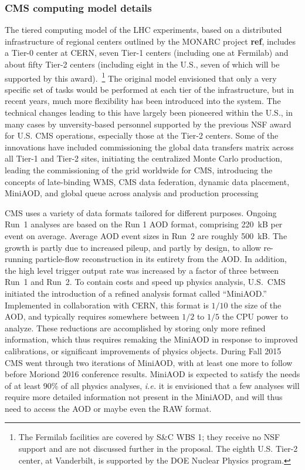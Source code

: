 \documentclass[11pt,a4paper]{article}
\begin{document}
\subsubsection{CMS computing model details}
\label{computingmodeldetails}
The tiered computing model of the LHC experiments, based on a distributed
infrastructure of regional centers outlined by the MONARC project {\bf
  ref}, includes a Tier-0 center at CERN, seven Tier-1 centers (including
one at Fermilab) and about fifty Tier-2 centers (including eight in the
U.S., seven of which will be supported by this award).~\footnote{The
  Fermilab facilities are covered by S\&C WBS 1; they receive no NSF
  support and are not discussed further in the proposal.  The eighth
  U.S. Tier-2 center, at Vanderbilt, is supported by the DOE Nuclear
  Physics program.}  The original model envisioned that only a very
specific set of tasks would be performed at each tier of the
infrastructure, but in recent years, much more flexibility has been
introduced into the system.  The technical changes leading to this have
largely been pioneered within the U.S., in many cases by unversity-based
personnel supported by the previous NSF award for U.S. CMS operations,
especially those at the Tier-2 centers.  Some of the innovations have
included commissioning the global data transfers matrix across all Tier-1
and Tier-2 sites, initiating the centralized Monte Carlo production,
leading the commissioning of the grid worldwide for CMS, introducing the
concepts of late-binding WMS, CMS data federation, dynamic data placement,
MiniAOD, and global queue across analysis and production processing

CMS uses a variety of data formats tailored for different purposes.
Ongoing Run~1 analyses are based on the Run 1 AOD format, comprising 220~kB
per event on average.  Average AOD event sizes in Run~2 are roughly
500~kB. The growth is partly due to increased pileup, and partly by design,
to allow re-running particle-flow reconstruction in its entirety from the
AOD.  In addition, the high level trigger output rate was increased by a
factor of three between Run~1 and Run~2.  To contain costs and speed up
physics analysis, U.S.~CMS initiated the introduction of a refined analysis
format called ``MiniAOD.''  Implemented in collaboration with CERN, this
format is $1/10$ the size of the AOD, and typically requires somewhere
between $1/2$ to $1/5$ the CPU power to analyze. These reductions are
accomplished by storing only more refined information, which thus requires remaking
the MiniAOD in response to improved calibrations, or significant
improvements of physics objects. During Fall 2015 CMS went through two
iterations of MiniAOD, with at least one more to follow before Moriond 2016
conference results.  MiniAOD is expected to satisfy the needs of at least
90\% of all physics analyses, {\it i.e.} it is envisioned that a few analyses
will require more detailed information not present in the MiniAOD, and will
thus need to access the AOD or maybe even the RAW format.
\end{document}
